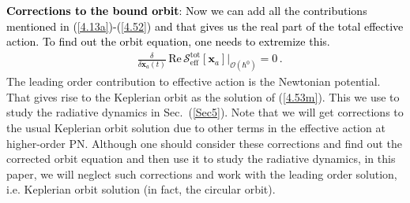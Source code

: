 \begin{table}[b!]
 \centering
 \caption{Table showing the number of diagrams contributing to a specific PN order for bound sector. Also, the orders at which terms to due the axion-photon coupling ($g_{a\gamma\gamma}$) and photon-dark photon kinetic mixing term ($\gamma$).}
 \label{table2mm}
 \end{table}
\vspace{0.5cm}
\textcolor{black}{{\bf Corrections to the bound orbit}: \textcolor{black}{Now we can add all the contributions mentioned in 
 (\ref{4.13a})-(\ref{4.52}) and that gives us the real part of the total effective action. To find out the orbit equation, one needs to extremize this.}
\begin{eqnarray}
  &  \frac{\delta}{\delta \boldsymbol{x}_a(t)}\,\text{Re}\,\mathcal{S}_{\text{eff}}^{\text{tot}}[\boldsymbol{x}_a]\Big |_{\mathcal{O}(\hbar^0)}=0\,.\label{4.53m}
\end{eqnarray}}
The leading order contribution to effective action is the Newtonian potential. That gives rise to the Keplerian orbit as the solution of (\ref{4.53m}). This we use to study the radiative dynamics in Sec.~(\ref{Sec5}). Note that we will get corrections to the usual Keplerian orbit solution due to other terms in the effective action at higher-order PN. Although one should consider these corrections and find out the corrected orbit equation and then use it to study the radiative dynamics, in this paper, we will neglect such corrections and work with the leading order solution, i.e. Keplerian orbit solution (in fact, the circular orbit). 
 

